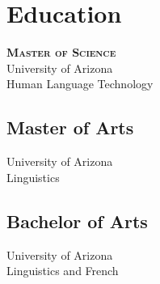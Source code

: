 \section{Education}

    {\scshape{\bfseries{\textsf{Master of Science}}}} \hfill {}\\
        University of Arizona\\
        Human Language Technology\\

    \subsection{Master of Arts}
        University of Arizona\\
        Linguistics\\

    \subsection{Bachelor of Arts}
        University of Arizona\\
        Linguistics and French\\
